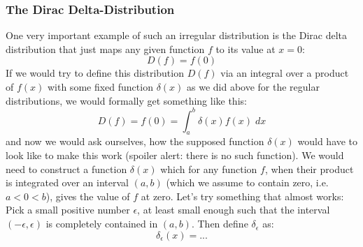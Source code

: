 
\subsubsection{The Dirac Delta-Distribution}
One very important example of such an irregular distribution is the Dirac delta distribution that just maps any given function $f$ to its value at $x = 0$:
\begin{equation}
 D(f) = f(0)
\end{equation}
If we would try to define this distribution $D(f)$ via an integral over a product of $f(x)$ with some fixed function $\delta(x)$ as we did above for the regular distributions, we would formally get something like this:
\begin{equation}
 D(f) = f(0) = \int_a^b \delta(x) f(x) \; dx
\end{equation}
and now we would ask ourselves, how the supposed function $\delta(x)$ would have to look like to make this work (spoiler alert: there is no such function). We would need to construct a function $\delta(x)$ which for any function $f$, when their product is integrated over an interval $(a,b)$ (which we assume to contain zero, i.e. $a < 0 < b$), gives the value of $f$ at zero. Let's try something that almost works: Pick a small positive number $\epsilon$, at least small enough such that the interval $(-\epsilon, \epsilon)$ is completely contained in $(a,b)$. Then define $\delta_{\epsilon}$ as:
\begin{equation}
 \delta_{\epsilon} (x) = ...
\end{equation}
